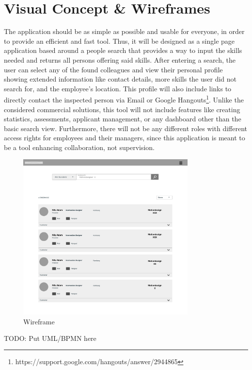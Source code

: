\section{Visual Concept \& Wireframes}
The application should be as simple as possible and usable for everyone, in order to provide an efficient and fast tool. Thus, it will be designed as a single page application based around a people search that provides a way to input the skills needed and returns all persons offering said skills. After entering a search, the user can select any of the found colleagues and view their personal profile showing extended information like contact details, more skills the user did not search for, and the employee's location. This profile will also include links to directly contact the inspected person via Email or Google Hangouts\footnote{https://support.google.com/hangouts/answer/2944865}. Unlike the considered commercial solutions, this tool will not include features like creating statistics, assessments, applicant management, or any dashboard other than the basic search view.
Furthermore, there will not be any different roles with different access rights for employees and their managers, since this application is meant to be a tool enhancing collaboration, not supervision.
\begin{figure}[!htp]
    \centering
    \includegraphics[width=0.8\textwidth]{images/wireframe.png}
    \caption{Wireframe}
    \label{fig:wireframe}
\end{figure}

TODO: Put UML/BPMN here



